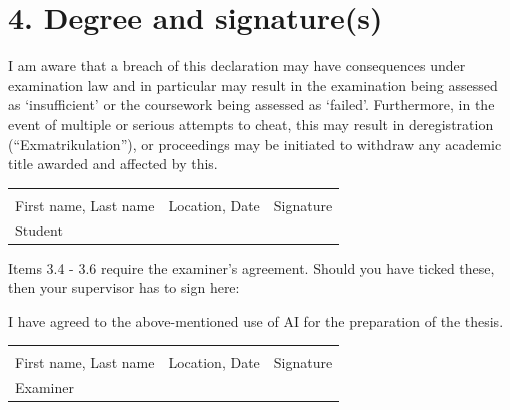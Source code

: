 \section*{4. Degree and signature(s)}

I am aware that a breach of this declaration may have consequences under examination law and in particular may result in the examination being assessed as ‘insufficient’ or the coursework being assessed as ‘failed’. Furthermore, in the event of multiple or serious attempts to cheat, this may result in deregistration (“Exmatrikulation”), or proceedings may be initiated to withdraw any academic title awarded and affected by this.

\vspace{1.5cm}

\noindent
\begin{tabular}{p{}p{}p{}}
\hrulefill & \hrulefill & \hrulefill\\
First name, Last name & Location, Date & Signature\\
Student & &
\end{tabular}

\vspace{1cm}

Items 3.4 - 3.6 require the examiner’s agreement. Should you have ticked these, then your supervisor has to sign here:

\vspace{0.5cm}

I have agreed to the above-mentioned use of AI for the preparation of the thesis.

\vspace{1.5cm}

\noindent
\begin{tabular}{p{}p{}p{}}
\hrulefill & \hrulefill & \hrulefill\\
First name, Last name & Location, Date & Signature\\
Examiner & &
\end{tabular}


